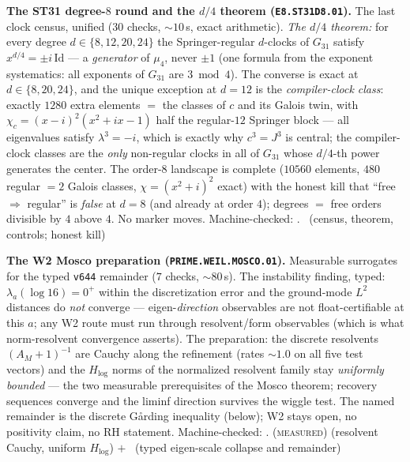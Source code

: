 \documentclass[11pt,a4paper]{article}
\theoremstyle{definition}
\begin{document}
\par\smallskip\noindent\textbf{The ST31 degree-$8$ round and the
$d/4$ theorem (\texttt{E8.ST31D8.01}).}
The last clock census, unified ($30$ checks, ${\sim}10$\,s, exact
arithmetic).  \emph{The $d/4$ theorem:} for every degree
$d\in\{8,12,20,24\}$ the Springer-regular $d$-clocks of $G_{31}$
satisfy $x^{d/4}=\pm i\,\mathrm{Id}$ --- a \emph{generator} of
$\mu_4$, never $\pm1$ (one formula from the exponent systematics:
all exponents of $G_{31}$ are $3\bmod4$).  The converse is exact at
$d\in\{8,20,24\}$, and the unique exception at $d=12$ is the
\emph{compiler-clock class}: exactly $1280$ extra elements $=$ the
classes of $c$ and its Galois twin, with
$\chi_c=(x-i)^2(x^2+ix-1)$ half the regular-$12$ Springer block ---
all eigenvalues satisfy $\lambda^3=-i$, which is exactly why
$c^3=J^3$ is central; the compiler-clock classes are the \emph{only}
non-regular clocks in all of $G_{31}$ whose $d/4$-th power generates
the center.  The order-$8$ landscape is complete ($10560$ elements,
$480$ regular $=2$ Galois classes, $\chi=(x^2+i)^2$ exact) with the
honest kill that ``free $\Rightarrow$ regular'' is \emph{false} at
$d=8$ (and already at order $4$); degrees $=$ free orders divisible
by $4$ above $4$.  No marker moves.
Machine-checked: .
\mE\ (census, theorem, controls; honest kill)
\par\smallskip

\par\smallskip\noindent\textbf{The W2 Mosco preparation
(\texttt{PRIME.WEIL.MOSCO.01}).}
Measurable surrogates for the typed \texttt{v644} remainder ($7$
checks, ${\sim}80$\,s).  The instability finding, typed:
$\lambda_a(\log 16)=0^+$ within the discretization error and the
ground-mode $L^2$ distances do \emph{not} converge ---
eigen-\emph{direction} observables are not float-certifiable at this
$a$; any W2 route must run through resolvent/form observables (which
is what norm-resolvent convergence asserts).  The preparation: the
discrete resolvents $(A_M+1)^{-1}$ are Cauchy along the refinement
(rates ${\sim}1.0$ on all five test vectors) and the $H_{\log}$
norms of the normalized resolvent family stay \emph{uniformly
bounded} --- the two measurable prerequisites of the Mosco theorem;
recovery sequences converge and the liminf direction survives the
wiggle test.  The named remainder is the discrete G\aa rding
inequality (below); W2 stays open, no positivity claim, no RH
statement.
Machine-checked: .
(\textsc{measured}) (resolvent Cauchy, uniform $H_{\log}$) $+$ \mC\
(typed eigen-scale collapse and remainder)
\par\smallskip
\end{document}

